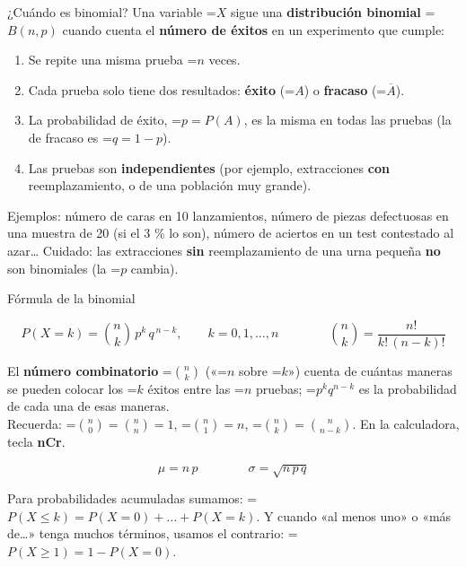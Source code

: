 \documentclass[11pt,a4paper]{article}
\newcommand{\fmm}[1]{\setbox0=\hbox{$#1$}\ifdim\wd0>\linewidth\[#1\]\else\mbox{\box0}\fi}
\begin{document}
  

  
\begin{fmdef}{¿Cuándo es binomial?}
Una variable \fmm{X} sigue una \textbf{distribución binomial} \fmm{B(n,p)} cuando cuenta el \textbf{número de éxitos} en un experimento que cumple:

      
\begin{enumerate}
\item Se repite una misma prueba \fmm{n} veces.
\item Cada prueba solo tiene dos resultados: \textbf{éxito} (\fmm{A}) o \textbf{fracaso} (\fmm{\overline A}).
\item La probabilidad de éxito, \fmm{p=P(A)}, es la misma en todas las pruebas (la de fracaso es \fmm{q=1-p}).
\item Las pruebas son \textbf{independientes} (por ejemplo, extracciones \textbf{con} reemplazamiento, o de una población muy grande).
\end{enumerate}

      
\begin{fmnote}Ejemplos: número de caras en 10 lanzamientos, número de piezas defectuosas en una muestra de 20 (si el 3 \% lo son), número de aciertos en un test contestado al azar\dots{} Cuidado: las extracciones \textbf{sin} reemplazamiento de una urna pequeña \textbf{no} son binomiales (la \fmm{p} cambia).\end{fmnote}
\end{fmdef}

  
\begin{fmprop}{Fórmula de la binomial}

\[P(X=k)=\binom{n}{k}\,p^k\,q^{\,n-k},\qquad k=0,1,\dots,n\qquad\qquad\binom nk=\frac{n!}{k!\,(n-k)!}\]

      

El \textbf{número combinatorio} \fmm{\binom nk} («\fmm{n} sobre \fmm{k}») cuenta de cuántas maneras se pueden colocar los \fmm{k} éxitos entre las \fmm{n} pruebas; \fmm{p^kq^{n-k}} es la probabilidad de cada una de esas maneras. \\
Recuerda: \fmm{\binom n0=\binom nn=1}, \fmm{\binom n1=n}, \fmm{\binom nk=\binom n{n-k}}. En la calculadora, tecla \textbf{nCr}.

      
\[\mu=n\,p\qquad\qquad\sigma=\sqrt{n\,p\,q}\]

      

Para probabilidades acumuladas sumamos: \fmm{P(X\leq k)=P(X=0)+\dots+P(X=k)}. Y cuando «al menos uno» o «más de\dots{}» tenga muchos términos, usamos el contrario: \fmm{P(X\geq1)=1-P(X=0)}.
\end{fmprop}
\end{document}
